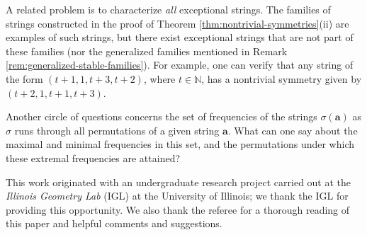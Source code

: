 \documentclass[10pt]{article}
\theoremstyle{definition}
\numberwithin{equation}{section}
\numberwithin{lemma}{section}
\newcommand{\NN}{\mathbb{N}}
\newcommand{\bfa}{\mathbf{a}}
\begin{document}
A related problem is to characterize \emph{all}
exceptional strings.  The families of strings constructed in the proof
of Theorem \ref{thm:nontrivial-symmetries}(ii) are examples of such
strings, but there exist exceptional strings that are not part of these
families (nor the generalized families mentioned in Remark
\ref{rem:generalized-stable-families}).  For example, one can verify
that any string of the form $(t+1,1,t+3,t+2)$, where $t\in\NN$, has a
nontrivial symmetry given by $(t+2,1,t+1,t+3)$.

Another circle of questions concerns the set of frequencies of 
the strings $\sigma(\bfa)$ as $\sigma$ runs through all
permutations of a given string $\bfa$.  What can one say about the
maximal and minimal frequencies in this set,
and the permutations under which these extremal frequencies are attained?

\vskip20pt 
This work originated with an undergraduate
research project carried out at the \emph{Illinois Geometry Lab}
(IGL) at the University of Illinois; we thank the IGL for providing this
opportunity.  We also thank the referee for a thorough reading of this
paper and helpful comments and suggestions. 






%
%
\end{document}
